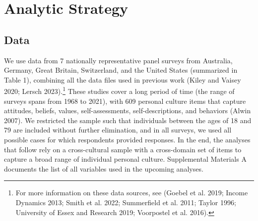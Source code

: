 \documentclass[
  12pt,
]{article}
\begin{document}
\hypertarget{analytic-strategy}{%
\section{Analytic Strategy}\label{analytic-strategy}}

\hypertarget{data}{%
\subsection{Data}\label{data}}

We use data from 7 nationally representative panel surveys from
Australia, Germany, Great Britain, Switzerland, and the United States
(summarized in Table 1), combining all the data files used in previous
work (Kiley and Vaisey 2020; Lersch 2023).\footnote{For more information
  on these data sources, see (Goebel et al. 2019; Income Dynamics 2013;
  Smith et al. 2022; Summerfield et al. 2011; Taylor 1996; University of
  Essex and Research 2019; Voorpostel et al. 2016).} These studies cover
a long period of time (the range of surveys spans from 1968 to 2021),
with 609 personal culture items that capture attitudes, beliefs, values,
self-assessments, self-descriptions, and behaviors (Alwin 2007). We
restricted the sample such that individuals between the ages of 18 and
79 are included without further elimination, and in all surveys, we used
all possible cases for which respondents provided responses. In the end,
the analyses that follow rely on a cross-cultural sample with a
cross-domain set of items to capture a broad range of individual
personal culture. Supplemental Materials A documents the list of all
variables used in the upcoming analyses.

\begin{table}[H]

\caption{\label{tab:unnamed-chunk-1}The Description of the Data Sources}
\centering
{}
\end{table}
\end{document}
